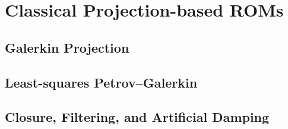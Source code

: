 \section{Classical Projection-based ROMs}

\subsection{Galerkin Projection}

\subsection{Least-squares Petrov--Galerkin}

\subsection{Closure, Filtering, and Artificial Damping}